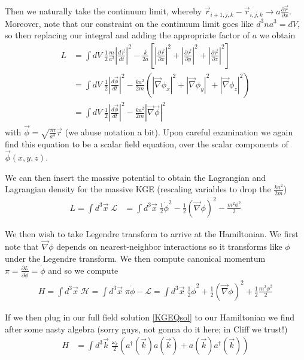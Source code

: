 \documentclass[12pt]{article}
\newcommand{\rd}[2]{\frac{d#1}{d#2}}
\newcommand{\pd}[2]{\frac{\partial#1}{\partial#2}}
\newcommand{\abs}[1]{\left|#1\right|}
\begin{document}
Then we naturally take the continuum limit, whereby $\vec{r}_{i+1,j,k} - \vec{r}_{i,j,k} \to a\pd{\vec{r}}{x}$. Moreover, note that our constraint on the continuum limit goes like $d^3n a^3 = dV$, so then replacing our integral and adding the appropriate factor of $a$ we obtain
\begin{align}
    L &= \int\limits_{}^{}dV\;\frac{1}{2}\frac{m}{a^3}\abs{\rd{\vec{r}}{t}}^2 - \frac{k}{2a}\left[ \left| \pd{\vec{r}}{x}  \right|^2 + \left| \pd{\vec{r}}{y}  \right|^2 + \left| \pd{\vec{r}}{z}  \right|^2 \right]\\
    &= \int\limits_{}^{}dV\;\frac{1}{2}\abs{\rd{\vec{\phi}}{t}}^2 - \frac{ka^2}{2m}\left( \abs{\vec{\nabla} \phi_x}^2 + \abs{\vec{\nabla} \phi_y}^2 + \abs{\vec{\nabla} \phi_z}^2 \right)\\
    &= \int\limits_{}^{}dV\;\frac{1}{2}\abs{\rd{\vec{\phi}}{t}}^2 - \frac{ka^2}{2m}\abs{\vec{\nabla}\vec{\phi}}^2
\end{align}
with $\vec{\phi} = \sqrt{\frac{m}{a^3}}\vec{r}$ (we abuse notation a bit). Upon careful examination we again find this equation to be a scalar field equation, over the scalar components of $\vec{\phi}(x,y,z)$. 

We can then insert the massive potential to obtain the Lagrangian and Lagrangian density for the massive KGE (rescaling variables to drop the $\frac{ka^2}{2m}$)
\begin{align}
    L = \int d^3\vec{x}\; \mathcal{L}&= \int d^3\vec{x} \;\frac{1}{2}\dot{\phi}^2 - \frac{1}{2}\left( \vec{\nabla}\phi \right)^2 - \frac{m^2\phi^2}{2}
\end{align}

We then wish to take Legendre transform to arrive at the Hamiltonian. We first note that $\vec{\nabla} \phi$ depends on nearest-neighbor interactions so it transforms like $\phi$ under the Legendre transform. We then compute canonical momentum $\pi = \pd{L}{\dot{\phi}} = \dot{\phi}$ and so we compute
\begin{align}
    H = \int d^3\vec{x}\; \mathcal{H} = \int d^3\vec{x}\; \pi \dot{\phi} - \mathcal{L} = \int d^3\vec{x}\; \frac{1}{2}\dot{\phi}^2 + \frac{1}{2}\left( \vec{\nabla}\phi \right)^2 + \frac{1}{2}\frac{m^2\phi^2}{2}
\end{align}

If we then plug in our full field solution \eqref{KGEQsol} to our Hamiltonian we find after some nasty algebra (sorry guys, not gonna do it here; in Cliff we trust!)
\begin{align}
    H &= \int d^3\vec{k}\; \frac{\omega_k}{2}\left( a^\dagger(\vec{k})a(\vec{k}) + a(\vec{k}) a^\dagger(\vec{k}) \right)
\end{align}
\end{document}
